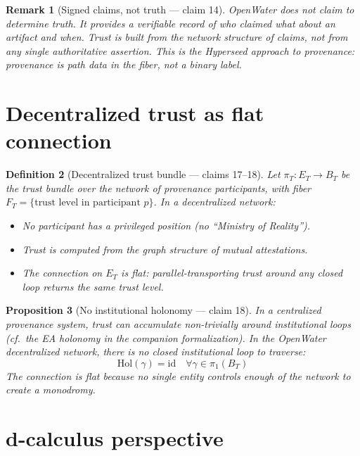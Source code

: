 \documentclass[11pt,a4paper]{article}
\newtheorem{definition}{Definition}[section]
\newtheorem{proposition}[definition]{Proposition}
\newtheorem{remark}[definition]{Remark}
\begin{document}
\begin{remark}[Signed claims, not truth --- claim 14]
OpenWater does not claim to determine truth. It provides a verifiable
record of who claimed what about an artifact and when. Trust is built
from the network structure of claims, not from any single authoritative
assertion. This is the Hyperseed approach to provenance: provenance is
path data in the fiber, not a binary label.
\end{remark}

\section{Decentralized trust as flat connection}
\label{sec:flat}

\begin{definition}[Decentralized trust bundle --- claims 17--18]
\label{def:flat}
Let $\pi_T : E_T \to B_T$ be the trust bundle over the network of
provenance participants, with fiber $F_T = \{\text{trust level in
participant } p\}$. In a decentralized network:
\begin{itemize}
\item No participant has a privileged position (no ``Ministry of Reality'').
\item Trust is computed from the graph structure of mutual attestations.
\item The connection on $E_T$ is flat: parallel-transporting trust around
  any closed loop returns the same trust level.
\end{itemize}
\end{definition}

\begin{proposition}[No institutional holonomy --- claim 18]
\label{prop:no-holonomy}
In a centralized provenance system, trust can accumulate non-trivially
around institutional loops (cf.\ the EA holonomy in the companion
formalization). In the OpenWater decentralized network, there is no
closed institutional loop to traverse:
\[
  \mathrm{Hol}(\gamma) = \mathrm{id} \quad \forall \gamma \in \pi_1(B_T)
\]
The connection is flat because no single entity controls enough of the
network to create a monodromy.
\end{proposition}

\section{d-calculus perspective}
\label{sec:d-calc}
\end{document}
